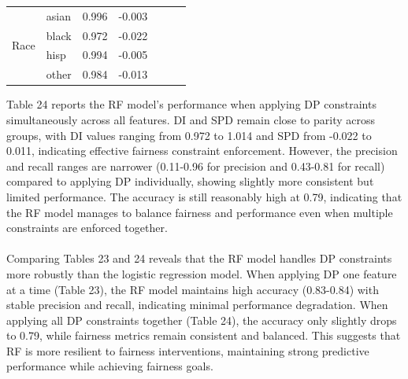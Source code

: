 \documentclass{article}
\begin{document}
\begin{table}[H]
\begin{tabular}{llcc|ccc}
\cline{1-4}
\multirow{4}{*}{Race}          & asian & 0.996                  & \multicolumn{1}{l|}{-0.003} &                                       &                                    &                              \\
                               & black & 0.972                  & \multicolumn{1}{l|}{-0.022} &                                       &                                    &                              \\
                               & hisp  & 0.994                  & \multicolumn{1}{l|}{-0.005} &                                       &                                    &                              \\
                               & other & 0.984                  & \multicolumn{1}{l|}{-0.013} &                                       &                                    &                             
\end{tabular}
\end{table}
Table 24 reports the RF model’s performance when applying DP constraints simultaneously across all features. DI and SPD remain close to parity across groups, with DI values ranging from 0.972 to 1.014 and SPD from -0.022 to 0.011, indicating effective fairness constraint enforcement. However, the precision and recall ranges are narrower (0.11-0.96 for precision and 0.43-0.81 for recall) compared to applying DP individually, showing slightly more consistent but limited performance. The accuracy is still reasonably high at 0.79, indicating that the RF model manages to balance fairness and performance even when multiple constraints are enforced together.\\ \\
Comparing Tables 23 and 24 reveals that the RF model handles DP constraints more robustly than the logistic regression model. When applying DP one feature at a time (Table 23), the RF model maintains high accuracy (0.83-0.84) with stable precision and recall, indicating minimal performance degradation. When applying all DP constraints together (Table 24), the accuracy only slightly drops to 0.79, while fairness metrics remain consistent and balanced. This suggests that RF is more resilient to fairness interventions, maintaining strong predictive performance while achieving fairness goals.
\end{document}
